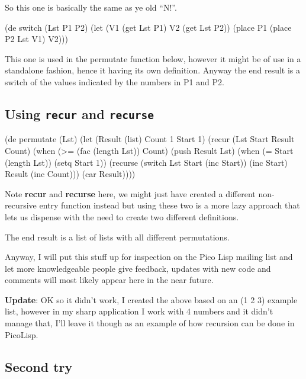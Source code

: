 So this one is basically the same as ye old ``N!''.

\begin{wideverbatim}
(de switch (Lst P1 P2)
  (let (V1 (get Lst P1) V2 (get Lst P2))      
      (place P1 (place P2 Lst V1) V2)))
\end{wideverbatim}

This one is used in the permutate function below, however it might be of
use in a standalone fashion, hence it having its own definition. Anyway
the end result is a switch of the values indicated by the numbers in P1
and P2.

\subsection{Using \texttt{recur} and \texttt{recurse}}
\label{sec:fact-perm-recur-using-recur}

\begin{wideverbatim}
(de permutate (Lst)      
   (let (Result (list) Count 1 Start 1) 
      (recur (Lst Start Result Count) 
         (when (>= (fac (length Lst)) Count)
            (push Result Lst)
            (when (= Start (length Lst)) (setq Start 1))
            (recurse 
               (switch Lst Start (inc Start)) 
               (inc Start) 
               Result 
               (inc Count)))
         (car Result))))
\end{wideverbatim}

Note \textbf{recur} and \textbf{recurse} here, we might just have
created a different non-recursive entry function instead but using
these two is a more lazy approach that lets us dispense with the need
to create two different definitions.

The end result is a list of lists with all different permutations.

Anyway, I will put this stuff up for inspection on the Pico Lisp mailing
list and let more knowledgeable people give feedback, updates with new
code and comments will most likely appear here in the near future. 

\textbf{Update}: OK so it didn't work, I created the above based on an
(1 2 3) example list, however in my sharp application I work with 4
numbers and it didn't manage that, I'll leave it though as an example
of how recursion can be done in PicoLisp.

\subsection{Second try}
\label{sec:fact-perm-recur-second-try}

